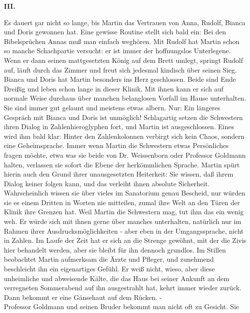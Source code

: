 \begin{center}
{\bf III.}
\end{center}
Es dauert gar nicht so lange, bis Martin das Vertrauen von Anna, Rudolf,
Bianca und Doris gewonnen hat. Eine gewisse Routine stellt sich bald ein: Bei
den Bibelspr\"uchen Annas mu{\ss} man einfach wegh\"oren. Mit Rudolf hat
Martin schon so manche Schachpartie versucht: er ist immer der hoffnungslos
Unterlegene. Wenn er dann seinen mattgesetzten K\"onig auf dem Brett umlegt,
springt Rudolf auf, l\"auft durch das Zimmer und freut sich jedesmal kindisch
\"uber seinen Sieg. Bianca und Doris hat Martin besonders ins Herz geschlossen.
Beide sind Ende Drei{\ss}ig und leben schon lange in dieser Klinik. Mit ihnen
kann er sich auf normale Weise durchaus \"uber manchen belanglosen Vorfall im
Hause unterhalten. Sie sind immer gut gelaunt und meistens etwas albern. Nur:
Ein l\"angeres Gespr\"ach mit Bianca und Doris ist unm\"oglich! Schlagartig
setzen die Schwestern ihren Dialog in Zahlenhieroglyphen fort, und Martin ist
ausgeschlossen. Eines wird ihm bald klar: Hinter den Zahlenkolonnen verbirgt
sich kein Chaos, sondern eine Geheimsprache. Immer wenn Martin die Schwestern
etwas Pers\"onliches fragen m\"ochte, etwa was sie beide von Dr. Weissenborn
oder Professor Goldmann halten, verlassen sie sofort die Ebene der
herk\"ommlichen Sprache. Martin sp\"urt hierin auch den Grund ihrer
unausgesetzten Heiterkeit: Sie wissen, da{\ss} ihrem Dialog keiner folgen
kann, und das verleiht ihnen absolute Sicherheit. Wahrscheinlich wissen sie
\"uber vieles im Sanatorium genau Bescheid, nur w\"urden sie es einem Dritten
in Worten nie mitteilen, zumal ihre Welt an den T\"uren der Klinik ihre Grenzen
hat. Weil Martin die Schwestern mag, tut ihm das ein wenig weh. Er w\"urde sich
mit ihnen gerne \"uber manches unterhalten, nat\"urlich nur im Rahmen ihrer
Ausdrucksm\"oglichkeiten - aber eben in der Umgangssprache, nicht in Zahlen.
Im Laufe der Zeit hat er sich an die Strenge gew\"ohnt, mit der die Zivis hier
behandelt werden, aber sie bleibt f\"ur ihn dennoch grundlos. Im Stillen
beobachtet Martin aufmerksam die \"Arzte und Pfleger, und zunehmend beschleicht
ihn ein eigenartiges Gef\"uhl. Er wei{\ss} nicht, wieso, aber diese unheimliche
und abweisende K\"alte, die das Haus bei seiner Ankunft an dem verregneten
Sommerabend auf ihn ausgestrahlt hat, kehrt immer wieder zur\"uck. Dann bekommt
er eine G\"ansehaut auf dem R\"ucken. - \\
\newpage \noindent %
Professor Goldmann und seinen Bruder bekommt man nicht oft zu Gesicht. Sie
